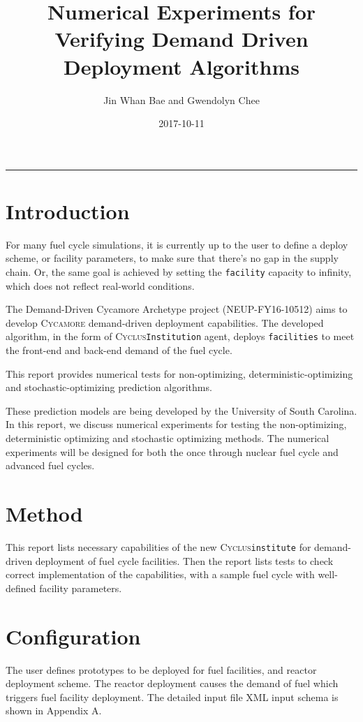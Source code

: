 \documentclass[12pt,letterpaper]{article}
\title{Numerical Experiments for Verifying Demand Driven Deployment Algorithms}
\author{Jin Whan Bae and Gwendolyn Chee}
\date{2017-10-11}
\newcommand{\Cyclus}{\textsc{Cyclus}\xspace}%
\newcommand{\Cycamore}{\textsc{Cycamore}\xspace}%
\begin{document}
	
	\maketitle
	\hrule
	\onehalfspacing
	\thispagestyle{empty}

\section{Introduction}
For many fuel cycle simulations, it is currently up to the user to define
a deploy scheme, or facility parameters, to make sure that there's no gap
in the supply chain. Or, the same goal is achieved by setting the
\texttt{facility} capacity to infinity, which does not reflect real-world
conditions. 

The Demand-Driven Cycamore Archetype project (NEUP-FY16-10512) aims to develop \Cycamore demand-driven deployment capabilities.
The developed algorithm, in the form of \Cyclus \texttt{Institution}
agent, deploys \texttt{facilities} to meet the front-end and back-end demand of the 
fuel cycle.

This report provides numerical tests for non-optimizing, deterministic-optimizing and stochastic-optimizing prediction algorithms.

These prediction models are being developed by the University of South Carolina. 
In this report, we discuss numerical experiments for testing the non-optimizing, 
deterministic optimizing and stochastic optimizing methods. The numerical 
experiments will be designed for both the once through nuclear fuel 
cycle and advanced fuel cycles. 


\section{Method}
This report lists necessary capabilities of the new \Cyclus \texttt{institute}
for demand-driven deployment of fuel cycle facilities. 
Then the report lists tests to check correct implementation of the capabilities,
with a sample fuel cycle with well-defined facility parameters.


\section{Configuration}
The user defines prototypes to be deployed for fuel facilities,
and reactor deployment scheme.  The reactor deployment causes the demand of fuel
which triggers fuel facility deployment. The detailed input file XML input schema
is shown in Appendix A. 
\end{document}
